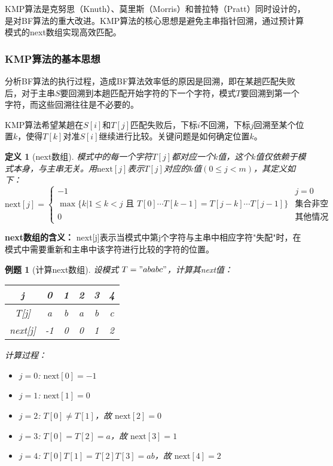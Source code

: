 \documentclass[12pt,a4paper]{amsart}
\newtheorem{definition}{定义}[section]
\newtheorem{example}{例题}[section]
\begin{document}
KMP算法是克努思（Knuth）、莫里斯（Morris）和普拉特（Pratt）同时设计的，是对BF算法的重大改进。KMP算法的核心思想是避免主串指针回溯，通过预计算模式的next数组实现高效匹配。

\subsubsection{KMP算法的基本思想}

分析BF算法的执行过程，造成BF算法效率低的原因是回溯，即在某趟匹配失败后，对于主串$S$要回溯到本趟匹配开始字符的下一个字符，模式$T$要回溯到第一个字符，而这些回溯往往是不必要的。

KMP算法希望某趟在$S[i]$和$T[j]$匹配失败后，下标$i$不回溯，下标$j$回溯至某个位置$k$，使得$T[k]$对准$S[i]$继续进行比较。关键问题是如何确定位置$k$。

\begin{definition}[next数组]
模式中的每一个字符$T[j]$都对应一个$k$值，这个$k$值仅依赖于模式本身，与主串无关。用$\text{next}[j]$表示$T[j]$对应的$k$值$(0 \leq j < m)$，其定义如下：
$$\text{next}[j] = \begin{cases}
-1 & j = 0 \\
\max\{k | 1 \leq k < j \text{ 且 } T[0]\cdots T[k-1] = T[j-k]\cdots T[j-1]\} & \text{集合非空} \\
0 & \text{其他情况}
\end{cases}$$
\end{definition}

\textbf{next数组的含义：}
next[j]表示当模式中第j个字符与主串中相应字符"失配"时，在模式中需要重新和主串中该字符进行比较的字符的位置。

\begin{example}[计算next数组]
设模式 $T = "ababc"$，计算其next值：

\begin{center}
\begin{tabular}{|c|c|c|c|c|c|}
\hline
j & 0 & 1 & 2 & 3 & 4 \\
\hline
T[j] & a & b & a & b & c \\
\hline
next[j] & -1 & 0 & 0 & 1 & 2 \\
\hline
\end{tabular}
\end{center}

计算过程：
\begin{itemize}
\item $j=0$: $\text{next}[0] = -1$
\item $j=1$: $\text{next}[1] = 0$
\item $j=2$: $T[0] \neq T[1]$，故 $\text{next}[2] = 0$
\item $j=3$: $T[0] = T[2] = a$，故 $\text{next}[3] = 1$
\item $j=4$: $T[0]T[1] = T[2]T[3] = ab$，故 $\text{next}[4] = 2$
\end{itemize}
\end{example}
\end{document}
